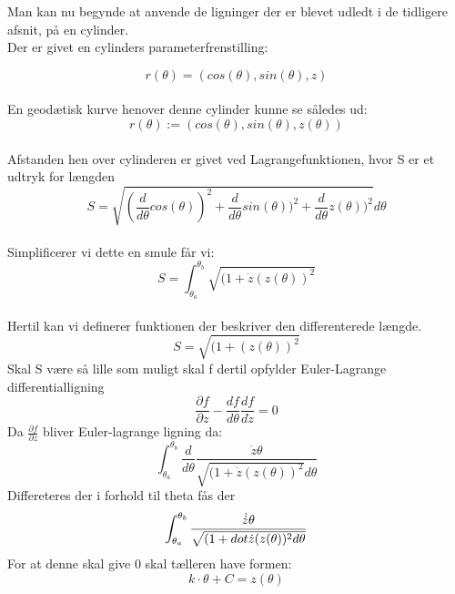 
Man kan nu begynde at anvende de ligninger der er blevet udledt i de tidligere afsnit, på en cylinder.
\\
Der er givet en cylinders parameterfrenstilling:

\begin{equation}
r(\theta)=(cos(\theta),sin(\theta),z)
\end{equation}
\\
En geodætisk kurve henover denne cylinder kunne se således ud:
\\
\begin{equation}
r(\theta):=(cos(\theta),sin(\theta),z(\theta))
\end{equation}
\\
Afstanden hen over cylinderen er givet ved Lagrangefunktionen, hvor S er et udtryk for længden
\begin{equation}
S = \sqrt{(\frac{d}{d\theta}cos(\theta))^2+\frac{d}{d\theta}sin(\theta))^2+\frac{d}{d\theta}z(\theta))^2}d\theta
\end{equation}
\\
Simplificerer vi dette en smule får vi:
\begin{equation*}
S=\int_{\theta_a}^{\theta_b}\sqrt{(1+\dot{z}(z(\theta))^2}
\end{equation*}
\\
Hertil kan vi definerer funktionen der beskriver den differenterede længde.
\begin{equation*}
S=\sqrt{(1+(z(\theta))^2}
\end{equation*}
Skal S være så lille som muligt skal f dertil opfylder Euler-Lagrange differentialligning
\begin{equation}
\frac{\partial f}{\partial z}-\frac{d f}{d \theta} \frac{d f}{d\dot{z}}=0
\end{equation}
Da $\frac{\partial f}{\partial z}$ bliver Euler-lagrange ligning da:
\begin{equation}
\int_{\theta_a}^{\theta_b}\frac{d}{d\theta}\frac{\dot{z}\theta}{\sqrt{(1+\dot{z}(z(\theta))^2}d\theta}
\end{equation}
Differeteres der i forhold til theta fås der
\begin{equation}
\int_{\theta_a}^{\theta_b}\frac{\dot{\dot{z}}\theta}{\sqrt{(1+\\dot{\dot{z}(z(\theta))^2}d\theta}}
\end{equation}
For at denne skal give 0 skal tælleren have formen:
\begin{equation}
k\cdot \theta+C = z(\theta)
\end{equation}
